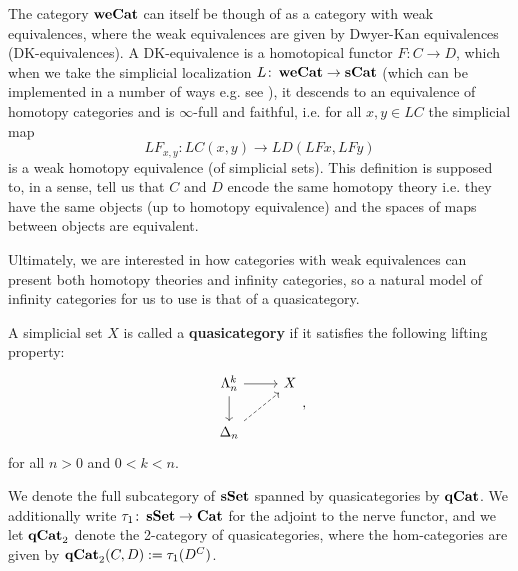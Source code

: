 \documentclass{amsart}
\begin{document}
The category $\operatorname{\mathbf{weCat}}$ can itself be though of as a category with weak equivalences, where the weak equivalences are given by Dwyer-Kan equivalences (DK-equivalences). A DK-equivalence is a homotopical functor $F\colon C\to D$, which when we take the simplicial localization $L\colon\operatorname{\mathbf{weCat}}\to\operatorname{\mathbf{sCat}}$ (which can be implemented in a number of ways e.g. see \cite{BK}), it descends to an equivalence of homotopy categories and is $\infty$-full and faithful, i.e. for all $x,y\in LC$ the simplicial map
$$ LF_{x,y}\colon LC(x,y)\to LD(LFx,LFy) $$
is a weak homotopy equivalence (of simplicial sets). This definition is supposed to, in a sense, tell us that $C$ and $D$ encode the same homotopy theory i.e. they have the same objects (up to homotopy equivalence) and the spaces of maps between objects are equivalent.

Ultimately, we are interested in how categories with weak equivalences can present both homotopy theories and infinity categories, so a natural model of infinity categories for us to use is that of a quasicategory.
\begin{defn}
    A simplicial set $X$ is called a \textbf{quasicategory} if it satisfies the following lifting property:
    \[\begin{tikzcd}
        \Lambda_n^k \arrow[r] \arrow[d] & X\\
        \Delta_n \arrow[ur, dashed]
    \end{tikzcd},\]
    for all $n>0$ and $0<k<n$.
\end{defn}

We denote the full subcategory of $\operatorname{\mathbf{sSet}}$ spanned by quasicategories by $\operatorname{\mathbf{qCat}}$. We additionally write $\tau_1\colon\operatorname{\mathbf{sSet}}\to\operatorname{\mathbf{Cat}}$ for the adjoint to the nerve functor, and we let $\operatorname{\mathbf{qCat}}_2$ denote the 2-category of quasicategories, where the hom-categories are given by $\operatorname{\mathbf{qCat}}_2(C,D):=\tau_1(D^C)$.
\end{document}

